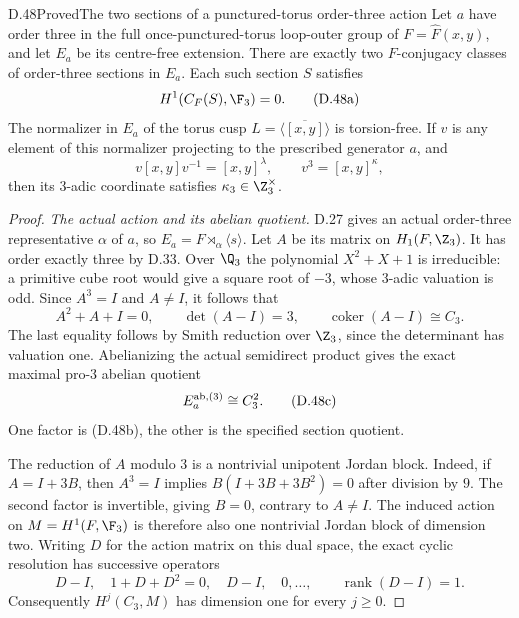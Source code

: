 \begin{claim}{D.48}{Proved}{The two sections of a punctured-torus order-three action}
Let $a$ have order three in the full once-punctured-torus
loop-outer group of $F=\widehat F(x,y)$, and let $E_a$
be its centre-free extension.
There are exactly two $F$-conjugacy classes of order-three
sections in $E_a$.  Each such section $S$ satisfies
\[
                         H^1(C_F(S),\F_3)=0.             \tag{D.48a}
\]
The normalizer in $E_a$ of the torus cusp
$L=\overline{\langle[x,y]\rangle}$ is torsion-free.
If $v$ is any element of this normalizer projecting
to the prescribed generator $a$, and
\[
             v[x,y]v^{-1}=[x,y]^\lambda,\qquad
                            v^3=[x,y]^\kappa ,
\]
then its $3$-adic coordinate satisfies
$\kappa_3\in\Z_3^\times$.
\end{claim}
\begin{proof}
\emph{The actual action and its abelian quotient.}
D.27 gives an actual order-three representative
$\alpha$ of $a$, so
$E_a=F\rtimes_\alpha\langle s\rangle$.
Let $A$ be its matrix on $H_1(F,\Z_3)$.
It has order exactly three by D.33.
Over $\Q_3$ the polynomial $X^2+X+1$ is irreducible:
a primitive cube root would give a square root of
$-3$, whose $3$-adic valuation is odd.
Since $A^3=I$ and $A\ne I$, it follows that
\[
             A^2+A+I=0,\qquad
             \det(A-I)=3,\qquad
             \operatorname{coker}(A-I)\cong C_3.
                                                        \tag{D.48b}
\]
The last equality follows by Smith reduction over
$\Z_3$, since the determinant has valuation one.
Abelianizing the actual semidirect product gives
the exact maximal pro-$3$ abelian quotient
\[
                     E_a^{\rm ab,(3)}\cong C_3^2.        \tag{D.48c}
\]
One factor is (D.48b), the other is the specified
section quotient.

The reduction of $A$ modulo $3$ is a nontrivial
unipotent Jordan block.  Indeed, if $A=I+3B$,
then $A^3=I$ implies
$B(I+3B+3B^2)=0$ after division by $9$.
The second factor is invertible, giving $B=0$,
contrary to $A\ne I$.
The induced action on
$M=H^1(F,\F_3)$ is therefore also one nontrivial
Jordan block of dimension two.
Writing $D$ for the action matrix on this dual
space, the exact cyclic resolution has successive
operators
\[
              D-I,\quad 1+D+D^2=0,\quad D-I,\quad0,\ldots,
 \qquad \operatorname{rank}(D-I)=1.
                                                        \tag{D.48d}
\]
Consequently $H^j(C_3,M)$ has dimension one for
every $j\geq0$.


\end{proof}
